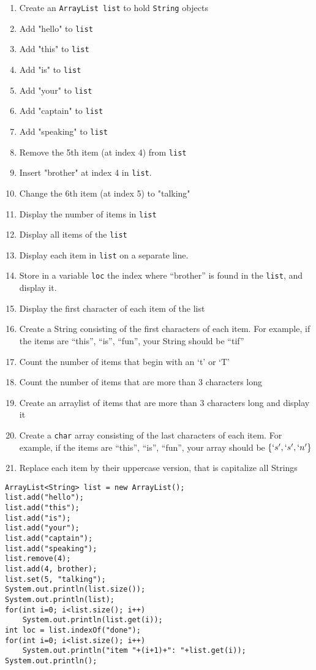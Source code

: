 \begin{questions}
\begin{enumerate}
	\item Create an \texttt{ArrayList list} to hold \texttt{String} objects
	\item Add "hello" to \texttt{list}
	\item Add "this" to \texttt{list}
	\item Add "is" to \texttt{list}
	\item Add "your" to \texttt{list}
	\item Add "captain" to \texttt{list}
	\item Add "speaking" to \texttt{list}
	\item Remove the 5th item (at index 4) from \texttt{list}
	\item Insert "brother" at index 4 in \texttt{list}.
	\item Change the 6th item (at index 5) to "talking"
	\item Display the number of items in \texttt{list}
	\item Display all items of the \texttt{list}
	\item Display each item in \texttt{list} on a separate line.
	\item Store in a variable \texttt{loc} the index where ``brother'' is found in the \texttt{list}, and display it.
	\item Display the first character of each item of the list
	\item Create a String consisting of the first characters of each item. For example, if the items are ``this'', ``is'', ``fun'', your String should be ``tif''
	\item Count the number of items that begin with an `t' or `T'
	\item Count the number of items that are more than 3 characters long
	\item Create an arraylist of items that are more than 3 characters long and display it
	\item Create a \texttt{char} array consisting of the last characters of each item. For example, if the items are ``this'', ``is'', ``fun'', your array should be $\{`s', `s', `n'\}$
	\item Replace each item by their uppercase version, that is capitalize all Strings
\end{enumerate}

\begin{solution}
\begin{lstlisting}
ArrayList<String> list = new ArrayList();
list.add("hello");
list.add("this");
list.add("is");
list.add("your");
list.add("captain");
list.add("speaking");
list.remove(4);
list.add(4, brother);
list.set(5, "talking");
System.out.println(list.size());
System.out.println(list);
for(int i=0; i<list.size(); i++)
    System.out.println(list.get(i));
int loc = list.indexOf("done");
for(int i=0; i<list.size(); i++)
	System.out.println("item "+(i+1)+": "+list.get(i));
System.out.println();


\end{lstlisting}
\end{solution}
\end{questions}
